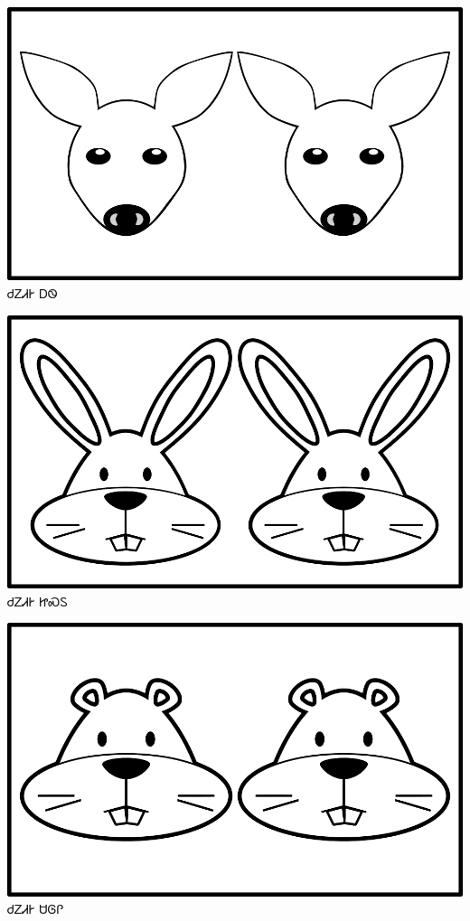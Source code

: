 \documentclass[avery5371]{flashcards}%
\begin{document}
    \begin{flashcard}{
        \includegraphics[width=0.95\columnwidth,height=.51\columnwidth,keepaspectratio]{../artwork/objects-animate/anitali-ahwi}
    }
        \Huge ᏧᏃᏗᎨ ᎠᏫ
    \end{flashcard}

    \begin{flashcard}{
        \includegraphics[width=0.95\columnwidth,height=.51\columnwidth,keepaspectratio]{../artwork/objects-animate/anitali-jisdu}
    }
        \Huge ᏧᏃᏗᎨ ᏥᏍᏚ
    \end{flashcard}

    \begin{flashcard}{
        \includegraphics[width=0.95\columnwidth,height=.51\columnwidth,keepaspectratio]{../artwork/objects-animate/anitali-saloli}
    }
        \Huge ᏧᏃᏗᎨ ᏌᎶᎵ
    \end{flashcard}
\end{document}
